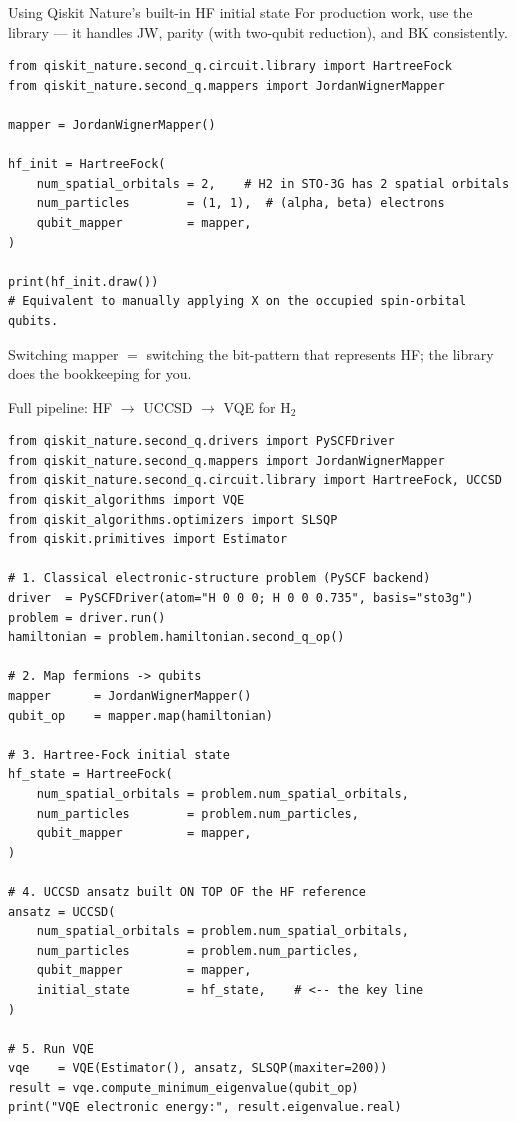 \documentclass[10pt,aspectratio=169]{beamer}
\begin{document}
\begin{frame}[fragile]{Using Qiskit Nature's built-in HF initial state}
For production work, use the library — it handles JW, parity (with two-qubit reduction), and BK consistently.
\begin{lstlisting}
from qiskit_nature.second_q.circuit.library import HartreeFock
from qiskit_nature.second_q.mappers import JordanWignerMapper

mapper = JordanWignerMapper()

hf_init = HartreeFock(
    num_spatial_orbitals = 2,    # H2 in STO-3G has 2 spatial orbitals
    num_particles        = (1, 1),  # (alpha, beta) electrons
    qubit_mapper         = mapper,
)

print(hf_init.draw())
# Equivalent to manually applying X on the occupied spin-orbital qubits.
\end{lstlisting}

\smallskip
Switching mapper $=$ switching the bit-pattern that represents HF; the library does the bookkeeping for you.
\end{frame}

\begin{frame}[fragile]{Full pipeline: HF $\to$ UCCSD $\to$ VQE for H$_2$}
\begin{lstlisting}
from qiskit_nature.second_q.drivers import PySCFDriver
from qiskit_nature.second_q.mappers import JordanWignerMapper
from qiskit_nature.second_q.circuit.library import HartreeFock, UCCSD
from qiskit_algorithms import VQE
from qiskit_algorithms.optimizers import SLSQP
from qiskit.primitives import Estimator

# 1. Classical electronic-structure problem (PySCF backend)
driver  = PySCFDriver(atom="H 0 0 0; H 0 0 0.735", basis="sto3g")
problem = driver.run()
hamiltonian = problem.hamiltonian.second_q_op()

# 2. Map fermions -> qubits
mapper      = JordanWignerMapper()
qubit_op    = mapper.map(hamiltonian)

# 3. Hartree-Fock initial state
hf_state = HartreeFock(
    num_spatial_orbitals = problem.num_spatial_orbitals,
    num_particles        = problem.num_particles,
    qubit_mapper         = mapper,
)

# 4. UCCSD ansatz built ON TOP OF the HF reference
ansatz = UCCSD(
    num_spatial_orbitals = problem.num_spatial_orbitals,
    num_particles        = problem.num_particles,
    qubit_mapper         = mapper,
    initial_state        = hf_state,    # <-- the key line
)

# 5. Run VQE
vqe    = VQE(Estimator(), ansatz, SLSQP(maxiter=200))
result = vqe.compute_minimum_eigenvalue(qubit_op)
print("VQE electronic energy:", result.eigenvalue.real)
\end{lstlisting}
\end{frame}
\end{document}
